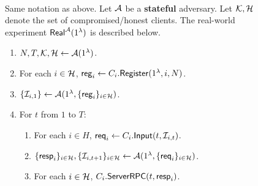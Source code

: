 \begin{figure}[h!]
\begin{framed}
\begin{definition} \hfill\\
\label{defn:real-world}
Same notation as above. Let $\mathcal{A}$ be a \textbf{stateful} adversary. Let $\mathcal{K}, \mathcal{H}$ denote the set of compromised/honest clients. The real-world experiment $\mathsf{Real}^{\mathcal{A}}(1^{\lambda})$ is described below.
\begin{enumerate}
\item $N, T, \mathcal{K}, \mathcal{H} \leftarrow \mathcal{A}(1^{\lambda})$.
\item For each $i \in \mathcal{H}$, $\mathsf{reg}_i \leftarrow C_i.\mathsf{Register}(1^{\lambda}, i, N)$. 
\item $\{\mathcal{I}_{i, 1}\} \leftarrow \mathcal{A}(1^{\lambda}, \{\mathsf{reg}_i\}_{i \in \mathcal{H}})$.
\item For $t$ from $1$ to $T$:
    \begin{enumerate}
    \item For each $i \in H$, $\mathsf{req}_i \leftarrow C_i.\mathsf{Input}(t, \mathcal{I}_{i, t})$.
    
    \item $\{\mathsf{resp}_i\}_{i \in \mathcal{H}}, \{\mathcal{I}_{i, t + 1}\}_{i \in \mathcal{H}} \leftarrow \mathcal{A}(1^{\lambda}, \{\mathsf{req}_i\}_{i \in \mathcal{H}})$.
    
    \item For each $i \in \mathcal{H}$, $C_i.\mathsf{ServerRPC}(t, \mathsf{resp}_i)$.
    \end{enumerate}
\end{enumerate}
\end{definition}
\end{framed}
\end{figure}

